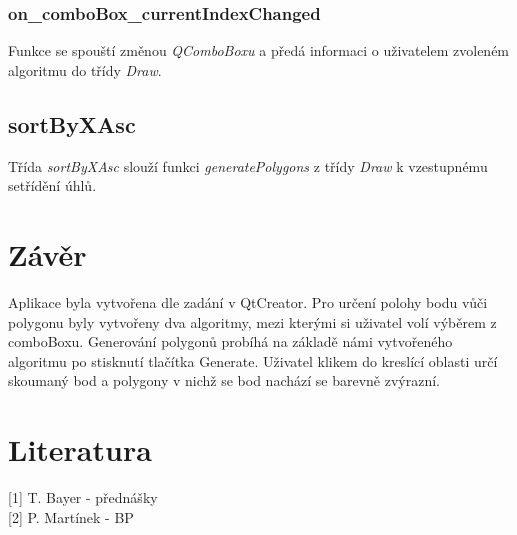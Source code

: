 \documentclass{article}
\begin{document}
\subsubsection{on\_comboBox\_currentIndexChanged}
Funkce se spouští změnou \emph{QComboBoxu} a předá informaci o uživatelem zvoleném algoritmu do třídy \emph{Draw}.

\subsection{sortByXAsc}
Třída \emph{sortByXAsc} slouží funkci \emph{generatePolygons} z třídy \emph{Draw} k vzestupnému setřídění úhlů.
\newpage
\section{Závěr}
Aplikace byla vytvořena dle zadání v QtCreator. Pro určení polohy bodu vůči polygonu byly vytvořeny dva algoritmy, mezi kterými si uživatel volí výběrem z comboBoxu. Generování polygonů probíhá na základě námi vytvořeného algoritmu po stisknutí tlačítka Generate. Uživatel klikem do kreslící oblasti určí skoumaný bod a polygony v nichž se bod nachází se barevně zvýrazní.

\newpage
\section{Literatura}

[1] T. Bayer - přednášky \\

[2] P. Martínek - BP

\end{document}
